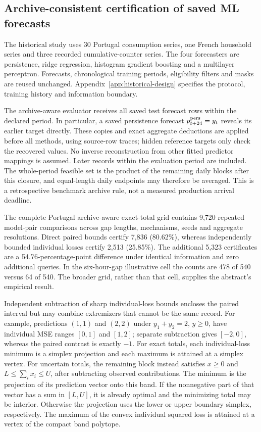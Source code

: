 \subsection{Archive-consistent certification of saved ML forecasts}
\label{sec:historical-application}
The historical study uses 30 Portugal consumption series, one French
household series and three recorded cumulative-counter series. The four
forecasters are persistence, ridge regression, histogram gradient boosting
and a multilayer perceptron. Forecasts, chronological training periods,
eligibility filters and masks are reused unchanged. Appendix~\ref{app:historical-design}
specifies the protocol, training history and information boundary.

The archive-aware evaluator receives all saved test forecast rows within
the declared period. In particular, a saved persistence forecast
$p_{t+24}^{\rm pers}=y_t$ reveals its earlier target directly. These copies
and exact aggregate deductions are applied before all methods, using
source-row traces; hidden reference targets only check the recovered
values. No inverse reconstruction from other fitted predictor mappings is
assumed. Later records within the evaluation period are included. The
whole-period feasible set is the product of the remaining daily blocks
after this closure, and equal-length daily endpoints may therefore be
averaged. This is a retrospective benchmark archive rule, not a measured
production arrival deadline.

The complete Portugal archive-aware exact-total grid contains 9,720
repeated model-pair comparisons across gap lengths, mechanisms, seeds and
aggregate resolutions. Direct paired bounds certify 7,836 (80.62\%),
whereas independently bounded individual losses certify 2,513 (25.85\%).
The additional 5,323 certificates are a 54.76-percentage-point difference
under identical information and zero additional queries. In the six-hour-gap
illustrative cell the counts are 478 of 540 versus 64 of 540. The broader
grid, rather than that cell, supplies the abstract's empirical result.

Independent subtraction of sharp individual-loss bounds encloses the
paired interval but may combine extremizers that cannot be the same
record. For example, predictions $(1,1)$ and $(2,2)$ under
$y_1+y_2=2$, $y\geq0$, have individual MSE ranges $[0,1]$ and $[1,2]$;
separate subtraction gives $[-2,0]$, whereas the paired contrast is exactly
$-1$. For exact totals, each individual-loss minimum is a simplex
projection and each maximum is attained at a simplex vertex. For uncertain
totals, the remaining block instead satisfies
$x\geq0$ and $L\leq\sum_i x_i\leq U$, after subtracting observed contributions.
The minimum is the projection of its prediction vector onto this band.
If the nonnegative part of that vector has a sum in $[L,U]$, it is already
optimal and the minimizing total may be interior. Otherwise the projection
uses the lower or upper boundary simplex, respectively. The maximum of
the convex individual squared loss is attained at a vertex of the compact
band polytope.

